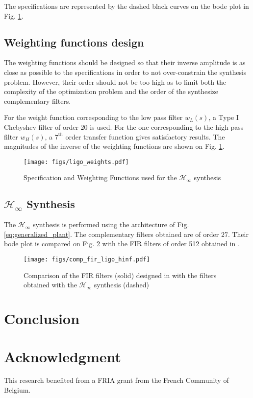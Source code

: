 \documentclass[letterpaper, 10 pt, conference]{ieeeconf}
\begin{document}
The specifications are represented by the dashed black curves on the bode plot in Fig. \ref{fig:ligo_weights}.

\subsection{Weighting functions design}
\label{sec:orgac7c8d0}
\label{sec:ligo_weights}
The weighting functions should be designed so that their inverse amplitude is as close as possible to the specifications in order to not over-constrain the synthesis problem.
However, their order should not be too high as to limit both the complexity of the optimization problem and the order of the synthesize complementary filters.

For the weight function corresponding to the low pass filter \(w_L(s)\), a Type I Chebyshev filter of order \(20\) is used. For the one corresponding to the high pass filter \(w_H(s)\), a \(7^{\text{th}}\) order transfer function gives satisfactory results.
The magnitudes of the inverse of the weighting functions are shown on Fig. \ref{fig:ligo_weights}.

\begin{figure}[htbp]
\centering
\texttt{[image: figs/ligo\_weights.pdf]}
\caption{\label{fig:ligo_weights}
Specification and Weighting Functions used for the \(\mathcal{H}_\infty\) synthesis}
\end{figure}

\subsection{\(\mathcal{H}_\infty\) Synthesis}
\label{sec:org9dfd8e0}
\label{sec:ligo_results}

The \(\mathcal{H}_\infty\) synthesis is performed using the architecture of Fig. \ref{eq:generalized_plant}.
The complementary filters obtained are of order \(27\).
Their bode plot is compared on Fig. \ref{fig:comp_fir_ligo_hinf} with the FIR filters of order 512 obtained in \cite{hua05_low_ligo}.

\begin{figure}[htbp]
\centering
\texttt{[image: figs/comp\_fir\_ligo\_hinf.pdf]}
\caption{\label{fig:comp_fir_ligo_hinf}
Comparison of the FIR filters (solid) designed in \cite{hua05_low_ligo} with the filters obtained with the \(\mathcal{H}_\infty\) synthesis (dashed)}
\end{figure}

\section{Conclusion}
\label{sec:org30078db}
\label{sec:conclusion}

\section{Acknowledgment}
\label{sec:orgf4d440c}
This research benefited from a FRIA grant from the French Community of Belgium.


\end{document}
